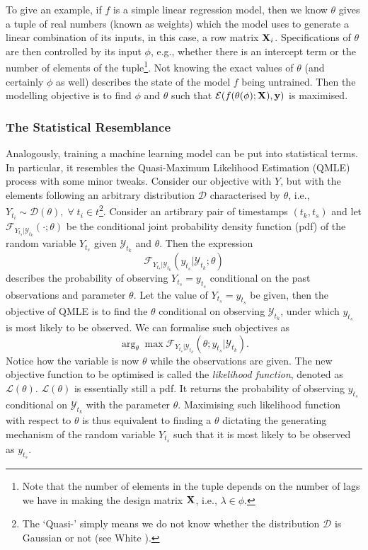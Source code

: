To give an example, if $f$ is a simple linear regression model, then we know $\theta$ gives a tuple of real numbers (known as weights) which the model uses to generate a linear combination of its inputs, in this case, a row matrix $\mathbf{X}_i$. Specifications of $\theta$ are then controlled by its input $\phi$, e.g., whether there is an intercept term or the number of elements of the tuple\footnote{Note that the number of elements in the tuple depends on the number of lags we have in making the design matrix $\mathbf{X}$, i.e., $\lambda \in \phi$.}. Not knowing the exact values of $\theta$ (and certainly $\phi$ as well) describes the state of the model $f$ being untrained. Then the modelling objective is to find $\phi$ and $\theta$ such that $\mathcal{E}(f(\theta(\phi); \mathbf{X}), \mathbf{y})$ is maximised.

\subsubsection{The Statistical Resemblance}
Analogously, training a machine learning model can be put into statistical terms. In particular, it resembles the Quasi-Maximum Likelihood Estimation (QMLE) process with some minor tweaks. Consider our objective with $Y$, but with the elements following an arbitrary distribution $\mathcal{D}$ characterised by $\theta$, i.e., $Y_{t_i} \sim \mathcal{D}(\theta), \; \forall \; t_i \in t$\footnote{The `Quasi-' simply means we do not know whether the distribution $\mathcal{D}$ is Gaussian or not (see White \citeyear{white1982maximum}).}. Consider an artibrary pair of timestamps $(t_k, t_s)$ and let $\mathcal{F}_{Y_{t_s} | \mathcal{Y}_{t_k}}(\cdot; \theta)$ be the conditional joint probability density function (pdf) of the random variable $Y_{t_s}$ given $\mathcal{Y}_{t_k}$ and $\theta$. Then the expression
\begin{equation*}
    \mathcal{F}_{Y_{t_s} | \mathcal{Y}_{t_k}}(y_{t_s}| \mathcal{Y}_{t_k} ; \theta)
\end{equation*}
describes the probability of observing $Y_{t_s} = y_{t_s}$ conditional on the past observations and parameter $\theta$. Let the value of $Y_{t_s} = y_{t_s}$ be given, then the objective of QMLE is to find the $\theta$ conditional on observing $\mathcal{Y}_{t_k}$, under which $y_{t_s}$ is most likely to be observed. We can formalise such objectives as
\begin{equation*}
    \arg_{\theta} \max \mathcal{F}_{Y_{t_s} | \mathcal{Y}_{t_k}}(\theta ; y_{t_s} | \mathcal{Y}_{t_k}).
\end{equation*}
Notice how the variable is now $\theta$ while the observations are given. The new objective function to be optimised is called the \textit{likelihood function}, denoted as $\mathcal{L}(\theta)$. $\mathcal{L}(\theta)$ is essentially still a pdf. It returns the probability of observing $y_{t_s}$ conditional on $\mathcal{Y}_{t_k}$ with the parameter $\theta$. Maximising such likelihood function with respect to $\theta$ is thus equivalent to finding a $\theta$ dictating the generating mechanism of the random variable $Y_{t_s}$ such that it is most likely to be observed as $y_{t_s}$.

